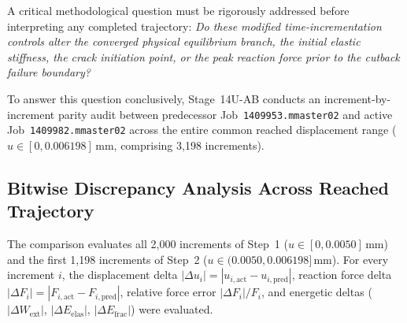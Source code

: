A critical methodological question must be rigorously addressed before interpreting any completed trajectory: \emph{Do these modified time-incrementation controls alter the converged physical equilibrium branch, the initial elastic stiffness, the crack initiation point, or the peak reaction force prior to the cutback failure boundary?}

To answer this question conclusively, Stage~14U-AB conducts an increment-by-increment parity audit between predecessor Job~\texttt{1409953.mmaster02} and active Job~\texttt{1409982.mmaster02} across the entire common reached displacement range ($u \in [0, 0.006198]\,\mathrm{mm}$, comprising 3,198 increments).

\subsection{Bitwise Discrepancy Analysis Across Reached Trajectory}
\label{subsec:stage14uab_discrepancy}

The comparison evaluates all 2,000 increments of Step~1 ($u \in [0, 0.0050]\,\mathrm{mm}$) and the first 1,198 increments of Step~2 ($u \in (0.0050, 0.006198]\,\mathrm{mm}$). For every increment $i$, the displacement delta $|\Delta u_i| = |u_{i,\mathrm{act}} - u_{i,\mathrm{pred}}|$, reaction force delta $|\Delta F_i| = |F_{i,\mathrm{act}} - F_{i,\mathrm{pred}}|$, relative force error $|\Delta F_i| / F_i$, and energetic deltas ($|\Delta W_{\mathrm{ext}}|$, $|\Delta E_{\mathrm{elas}}|$, $|\Delta E_{\mathrm{frac}}|$) were evaluated.

